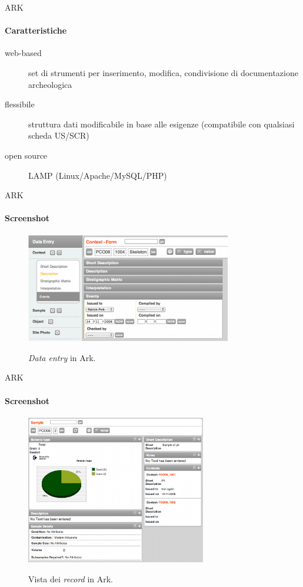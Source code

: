 \documentclass[xcolor=svgnames]{beamer}
\begin{document}

		\begin{frame}{ARK}
		\framesubtitle{Caratteristiche}
			\begin{description}
				\item[web-based] set di strumenti per inserimento, modifica, condivisione di documentazione archeologica
				\item[flessibile]struttura dati modificabile in base alle esigenze (compatibile con qualsiasi scheda US/SCR)
				\item[open source] LAMP (Linux/Apache/MySQL/PHP)
			\end{description}
		\end{frame}


		\begin{frame}{ARK}
		\framesubtitle{Screenshot}
			\begin{figure}
				\centering
				\caption[\emph{Data entry} in Ark.]{\emph{Data entry} in Ark.}
				\includegraphics[width=0.8\textwidth]{img/ark_data_entry}
				\label{fig:data_entry}
			\end{figure}
		\end{frame}


		\begin{frame}{ARK}
		\framesubtitle{Screenshot}
			\begin{figure}
				\centering
				\caption[Vista dei \emph{record} in Ark.]{Vista dei \emph{record} in Ark.}
				\includegraphics[width=0.7\textwidth]{img/ark_record_view}
				\label{fig:data_entry}
			\end{figure}
		\end{frame}
\end{document}
